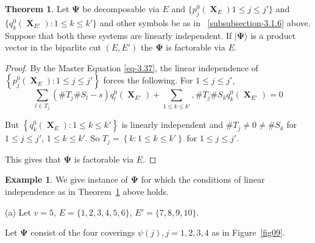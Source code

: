 \documentclass[a4paper,12pt]{article}
\DeclareMathOperator{\x}{\mathrm{X}}
\theoremstyle{definition}
\theoremstyle{underlinethm}
\newtheorem{thm}{Theorem}[section]
\newtheorem{example}{Example}[section]
\theoremstyle{definition}
\begin{document}
\begin{thm}\label{thm-3.5}
Let $\boldsymbol{\Psi}$ be decomposable via $E$ and $\{p_{j}^{0}(\boldsymbol{\x}_{E}) 1 \leq j \leq j'\}$ and $\{q_{k}^{0} (\boldsymbol{\x}_{E'}) : 1 \leq k \leq k'\}$ and other symbols be as in ~\eqref{subsubsection-3.1.6} above. Suppose that both these systems are linearly independent. If $| \boldsymbol{\Psi} \rangle$ is a product vector in the biparlite cut $(E, E')$ the $\boldsymbol{\Psi}$ is factorable via $E$.
\end{thm}

\begin{proof}
By the Master Equation \eqref{eq-3.37}, the linear independence of $\left\{p_{j}^{0} (\boldsymbol{\x}_{E}) : 1 \leq j \leq j'\right\}$ forces the following. For $1 \leq j \leq j'$,  
\begin{equation}
\sum\limits_{l\in T_{j}} (\# T_{j} \# S_{l}-s) q_{l}^{0}(\boldsymbol{\x}_{E'}) + \sum_{1 \leq k \leq k'}, \# T_{j} \# S_{k} q_{k}^{0}(\boldsymbol{\x}_{E'}) = 0\tag{3.40}\label{eq-3.40} 
\end{equation}

But $\left\{q_{k}^{0}(\boldsymbol{\x}_{E}): 1 \leq k \leq k' \right\}$ is linearly independent and $\# T_{j} \neq 0 \neq \# S_{k}$ for $1 \leq j \leq j'$, $1 \leq k \leq k'$. So $T_{j} = \left\{k : 1 \leq k \leq k'\right\}$ for $1 \leq j \leq j'$.

This gives that $\boldsymbol{\Psi}$ is factorable via $E$.
\end{proof}

\begin{example}\label{example-3.3}
We give instance of $\boldsymbol{\Psi}$ for which the conditions of linear independence as in Theorem~\ref{thm-3.5} above holds. 

(a) Let $v=5$, $E = \{1,2,3,4,5,6\}$, $E' = \{7,8,9,10\}$.

Let $\boldsymbol{\Psi}$ consist of the four coverings $\psi (j), j = 1,2,3,4$ as in Figure~\ref{fig09}.
\end{example}
\end{document}
